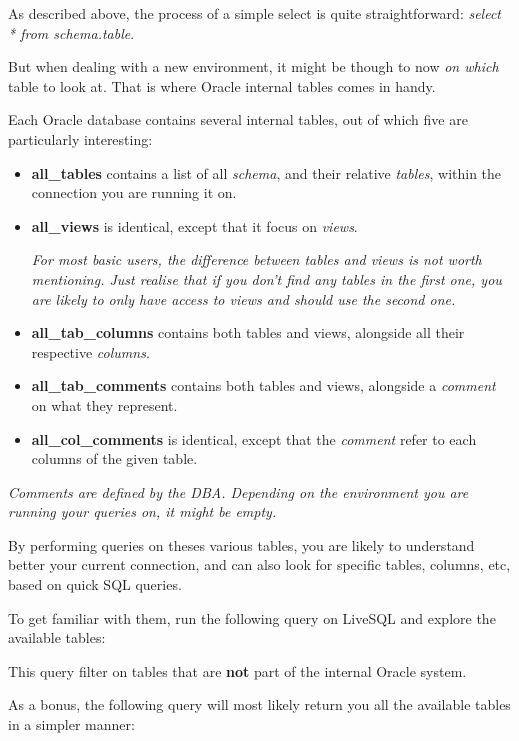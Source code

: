 \documentclass[12pt, letterpaper]{report}
\begin{document}
As described above, the process of a simple select is quite straightforward: \textit{select * from schema.table}.

But when dealing with a new environment, it might be though to now \textit{on which} table to look at. That is where Oracle internal tables comes in handy.

Each Oracle database contains several internal tables, out of which five are particularly interesting:
\begin{itemize}
	\item \textbf{all\_tables} contains a list of all \textit{schema}, and their relative \textit{tables}, within the connection you are running it on.
	\item \textbf{all\_views} is identical, except that it focus on \textit{views}.
	
	\textit{For most basic users, the difference between tables and views is not worth mentioning. Just realise that if you don't find any tables in the first one, you are likely to only have access to views and should use the second one.}
	
	\item \textbf{all\_tab\_columns} contains both tables and views, alongside all their respective \textit{columns}.
	\item \textbf{all\_tab\_comments} contains both tables and views, alongside a \textit{comment} on what they represent.
	\item \textbf{all\_col\_comments} is identical, except that the \textit{comment} refer to each columns of the given table.
\end{itemize}

\textit{Comments are defined by the DBA. Depending on the environment you are running your queries on, it might be empty.}

By performing queries on theses various tables, you are likely to understand better your current connection, and can also look for specific tables, columns, etc, based on quick SQL queries.

To get familiar with them, run the following query on LiveSQL and explore the available tables:


This query filter on tables that are \textbf{not} part of the internal Oracle system.

As a bonus, the following query will most likely return you all the available tables in a simpler manner:

\end{document}
